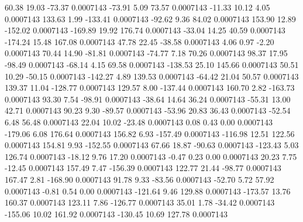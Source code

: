        60.38       19.03      -73.37     0.0007143
      -73.91        5.09       73.57     0.0007143
      -11.33       10.12        4.05     0.0007143
      133.63        1.99     -133.41     0.0007143
      -92.62        9.36       84.02     0.0007143
      153.90       12.89     -152.02     0.0007143
     -169.89       19.92      176.74     0.0007143
      -33.04       14.25       40.59     0.0007143
     -174.24       15.48      167.08     0.0007143
       47.78       22.45      -38.58     0.0007143
        4.06        0.97       -2.20     0.0007143
       70.44       14.90      -81.81     0.0007143
      -74.77        7.18       70.26     0.0007143
       98.37       17.95      -98.49     0.0007143
      -68.14        4.15       69.58     0.0007143
     -138.53       25.10      145.66     0.0007143
       50.51       10.29      -50.15     0.0007143
     -142.27        4.89      139.53     0.0007143
      -64.42       21.04       50.57     0.0007143
      139.37       11.04     -128.77     0.0007143
      129.57        8.00     -137.44     0.0007143
      160.70        2.82     -163.73     0.0007143
       93.30        7.54      -98.91     0.0007143
      -38.64       14.64       36.24     0.0007143
      -55.31       13.00       42.71     0.0007143
       90.23        9.30      -89.57     0.0007143
      -53.96       20.83       36.43     0.0007143
      -52.54        6.48       56.48     0.0007143
       22.04       10.02      -23.48     0.0007143
        0.08        0.43        0.00     0.0007143
     -179.06        6.08      176.64     0.0007143
      156.82        6.93     -157.49     0.0007143
     -116.98       12.51      122.56     0.0007143
      154.81        9.93     -152.55     0.0007143
       67.66       18.87      -90.63     0.0007143
     -123.43        5.03      126.74     0.0007143
      -18.12        9.76       17.20     0.0007143
       -0.47        0.23        0.00     0.0007143
       20.23        7.75      -12.45     0.0007143
      157.49        7.47     -156.39     0.0007143
      122.77       21.44      -98.77     0.0007143
      167.47        2.81     -168.90     0.0007143
       91.78        9.33      -83.56     0.0007143
      -52.70        5.72       57.92     0.0007143
       -0.81        0.54        0.00     0.0007143
     -121.64        9.46      129.88     0.0007143
     -173.57       13.76      160.37     0.0007143
      123.11        7.86     -126.77     0.0007143
       35.01        1.78      -34.42     0.0007143
     -155.06       10.02      161.92     0.0007143
     -130.45       10.69      127.78     0.0007143
